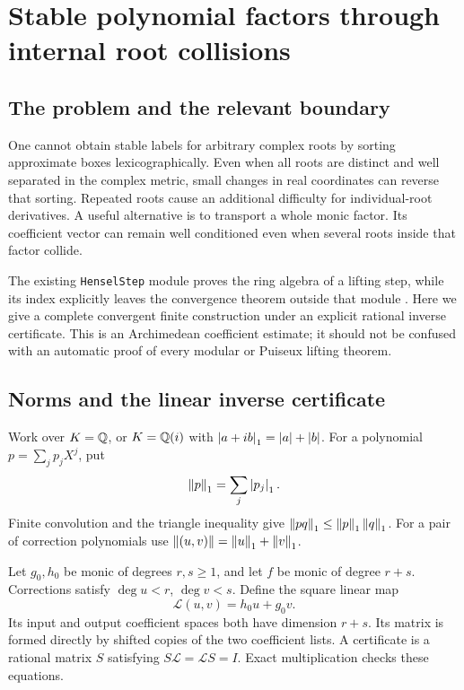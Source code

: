 \section{Stable polynomial factors through internal root collisions}\label{sec:factors}

\subsection{The problem and the relevant boundary}

One cannot obtain stable labels for arbitrary complex roots by sorting approximate boxes lexicographically. Even when all roots are distinct and well separated in the complex metric, small changes in real coordinates can reverse that sorting. Repeated roots cause an additional difficulty for individual-root derivatives. A useful alternative is to transport a whole monic factor. Its coefficient vector can remain well conditioned even when several roots inside that factor collide.

The existing \texttt{HenselStep} module proves the ring algebra of a lifting step, while its index explicitly leaves the convergence theorem outside that module \cite{repo-hensel}. Here we give a complete convergent finite construction under an explicit rational inverse certificate. This is an Archimedean coefficient estimate; it should not be confused with an automatic proof of every modular or Puiseux lifting theorem.

\subsection{Norms and the linear inverse certificate}

Work over \(K=\mathbb Q\), or \(K=\mathbb Q(i)\) with \(\left|a+ib\right|_1=\left|a\right|+\left|b\right|\). For a polynomial \(p=\sum_jp_jX^j\), put
\[
 \left\lVert p\right\rVert_1=\sum_j\left|p_j\right|_1.
\]
Finite convolution and the triangle inequality give
\(\left\lVert pq\right\rVert_1\le\left\lVert p\right\rVert_1\left\lVert q\right\rVert_1\).
For a pair of correction polynomials use
\(\left\lVert(u,v)\right\rVert=\left\lVert u\right\rVert_1+\left\lVert v\right\rVert_1\).

Let \(g_0,h_0\) be monic of degrees \(r,s\ge1\), and let \(f\) be monic of degree \(r+s\). Corrections satisfy \(\deg u<r\), \(\deg v<s\). Define the square linear map
\begin{equation}\label{eq:sylvester-map}
 \mathcal L(u,v)=h_0u+g_0v.
\end{equation}
Its input and output coefficient spaces both have dimension \(r+s\). Its matrix is formed directly by shifted copies of the two coefficient lists. A certificate is a rational matrix \(S\) satisfying
\(S\mathcal L=\mathcal LS=I\). Exact multiplication checks these equations.

